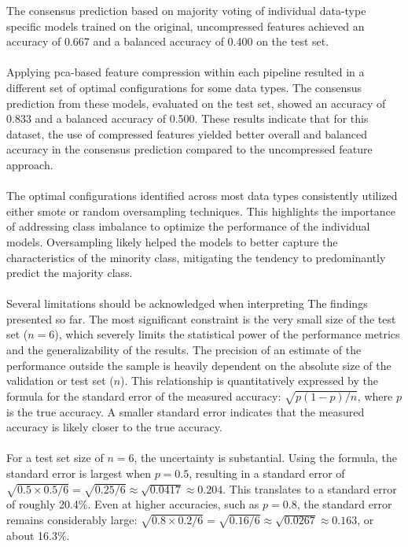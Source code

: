 \documentclass[12pt,a4paper]{report}
\begin{document}
\noindent
The consensus prediction based on majority voting of individual data-type specific models trained on the original, uncompressed features achieved an accuracy of 0.667 and a balanced accuracy of 0.400 on the test set.\\
\\
Applying \gls{pca}-based feature compression within each pipeline resulted in a different set of optimal configurations for some data types. The consensus prediction from these models, evaluated on the test set, showed an accuracy of 0.833 and a balanced accuracy of 0.500. These results indicate that for this dataset, the use of compressed features yielded better overall and balanced accuracy in the consensus prediction compared to the uncompressed feature approach.\\
\\
The optimal configurations identified across most data types consistently utilized either \gls{smote} or random oversampling techniques. This highlights the importance of addressing class imbalance to optimize the performance of the individual models. Oversampling likely helped the models to better capture the characteristics of the minority class, mitigating the tendency to predominantly predict the majority class.\\
\\
Several limitations should be acknowledged when interpreting The findings presented so far. The most significant constraint is the very small size of the test set ($n=6$), which severely limits the statistical power of the performance metrics and the generalizability of the results. The precision of an estimate of the performance outside the sample is heavily dependent on the absolute size of the validation or test set ($n$). This relationship is quantitatively expressed by the formula for the standard error of the measured accuracy: $\sqrt{p(1-p)/n}$, where $p$ is the true accuracy. A smaller standard error indicates that the measured accuracy is likely closer to the true accuracy.\\
\\
For a test set size of $n=6$, the uncertainty is substantial. Using the formula, the standard error is largest when $p=0.5$, resulting in a standard error of $\sqrt{0.5 \times 0.5 / 6} = \sqrt{0.25 / 6} \approx \sqrt{0.0417} \approx 0.204$. This translates to a standard error of roughly 20.4\%. Even at higher accuracies, such as $p=0.8$, the standard error remains considerably large: $\sqrt{0.8 \times 0.2 / 6} = \sqrt{0.16 / 6} \approx \sqrt{0.0267} \approx 0.163$, or about 16.3\%.\\
\end{document}
